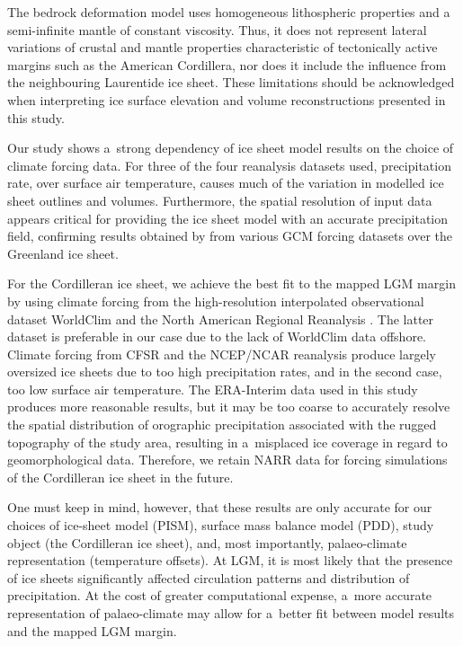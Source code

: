 \documentclass[tc, ms]{copernicus}
\begin{document}
The bedrock deformation model uses homogeneous lithospheric properties and a semi-infinite mantle of constant viscosity. Thus, it does not represent lateral variations of crustal and mantle properties characteristic of tectonically active margins such as the American Cordillera, nor does it include the influence from the neighbouring Laurentide ice sheet. These limitations should be acknowledged when interpreting ice surface elevation and volume reconstructions presented in this study.

\conclusions
\label{sec:concl}

Our study shows a~strong dependency of ice sheet model results on the choice of climate forcing data. For three of the four reanalysis datasets used, precipitation rate, over surface air temperature, causes much of the variation in modelled ice sheet outlines and volumes. Furthermore, the spatial resolution of input data appears critical for providing the ice sheet model with an accurate precipitation field, confirming results obtained by \citet{quiquet-etal-2012} from various GCM forcing datasets over the Greenland ice sheet.

For the Cordilleran ice sheet, we achieve the best fit to the mapped LGM margin by \citet{dyke-2004} using climate forcing from the high-resolution interpolated observational dataset WorldClim \citep{data:worldclim} and the North American Regional Reanalysis \citep[NARR;][]{data:narr}. The latter dataset is preferable in our case due to the lack of WorldClim data offshore. Climate forcing from CFSR and the NCEP/NCAR reanalysis produce largely oversized ice sheets due to too high precipitation rates, and in the second case, too low surface air temperature. The ERA-Interim data used in this study produces more reasonable results, but it may be too coarse to accurately resolve the spatial distribution of orographic precipitation associated with the rugged topography of the study area, resulting in a~misplaced ice coverage in regard to geomorphological data. Therefore, we retain NARR data for forcing simulations of the Cordilleran ice sheet in the future.

One must keep in mind, however, that these results are only accurate for our choices of ice-sheet model (PISM), surface mass balance model (PDD), study object (the Cordilleran ice sheet), and, most importantly, palaeo-climate representation (temperature offsets). At LGM, it is most likely that the presence of ice sheets significantly affected circulation patterns and distribution of precipitation. At the cost of greater computational expense, a~more accurate representation of palaeo-climate may allow for a~better fit between model results and the mapped LGM margin.
\end{document}
